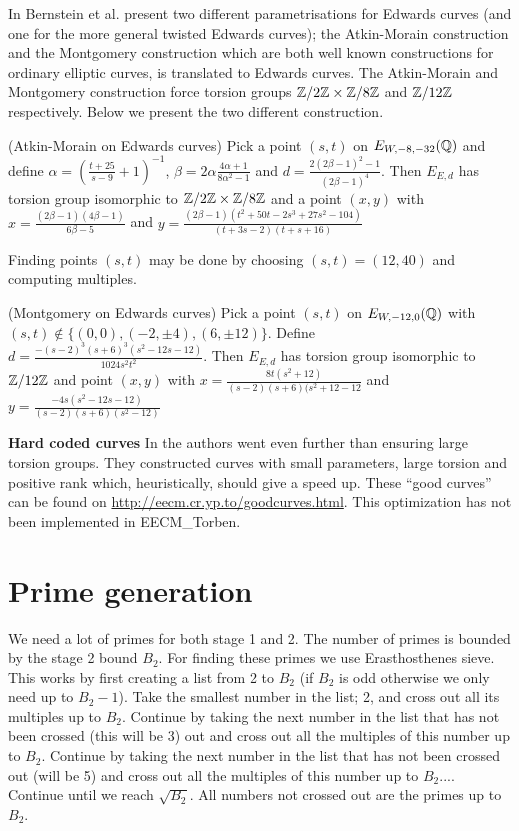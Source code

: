In \cite{2011/BBLP-eecm} Bernstein et al. present two different parametrisations for Edwards curves (and one for the more general twisted Edwards curves); the Atkin-Morain construction and the Montgomery construction which are both well known constructions for ordinary elliptic curves, is translated to Edwards curves. The Atkin-Morain and Montgomery construction force torsion groups $\mathbb{Z}/2\mathbb{Z}\times \mathbb{Z}/8\mathbb{Z}$ and $\mathbb{Z}/12\mathbb{Z}$ respectively. Below we present the two different construction.
\begin{thm}
(Atkin-Morain on Edwards curves) Pick a point $(s,t)$ on $E_{W,-8,-32}(\mathbb{Q})$ and define $\alpha=\left(\frac{t+25}{s-9}+1\right)^{-1}$, $\beta=2\alpha\frac{4\alpha+1}{8\alpha^2-1}$ and $d=\frac{2(2\beta-1)^2-1}{(2\beta-1)^4}$. Then $E_{E,d}$ has torsion group isomorphic to $\mathbb{Z}/2\mathbb{Z}\times \mathbb{Z}/8\mathbb{Z}$ and a point $(x,y)$ with $x=\frac{(2\beta-1)(4\beta-1)}{6\beta-5}$ and $y=\frac{(2\beta-1)(t^2+50t-2s^3+27s^2-104)}{(t+3s-2)(t+s+16)}$
\end{thm}
Finding points $(s,t)$ may be done by choosing $(s,t)=(12,40)$ and computing multiples. 
\begin{thm}
(Montgomery on Edwards curves) Pick a point $(s,t)$ on $E_{W,-12,0}(\mathbb{Q})$ with $(s,t)\notin \{(0,0),(-2,\pm 4),(6,\pm 12)\}$. Define $d=\frac{-(s-2)^3(s+6)^3(s^2-12s-12)}{1024s^2t^2}$. Then $E_{E,d}$ has torsion group isomorphic to $\mathbb{Z}/12\mathbb{Z}$ and point $(x,y)$ with $x=\frac{8t(s^2+12)}{(s-2)(s+6)(s^2+12-12}$ and $y=\frac{-4s(s^2-12s-12)}{(s-2)(s+6)(s^2-12)}$
\end{thm}

\textbf{Hard coded curves}
In \cite{2011/BBLP-eecm} the authors went even further than ensuring large torsion groups. They constructed curves with small parameters, large torsion and positive rank which, heuristically, should give a speed up. These ``good curves'' can be found on \url{http://eecm.cr.yp.to/goodcurves.html}. This optimization has not been implemented in EECM\_Torben. 

\section{Prime generation}
We need a lot of primes for both stage 1 and 2. The number of primes is bounded by the stage 2 bound $B_2$. For finding these primes we use Erasthosthenes sieve. This works by first creating a list from 2 to $B_2$ (if $B_2$ is odd otherwise we only need up to $B_2-1$). Take the smallest number in the list; 2, and cross out all its multiples up to $B_2$. Continue by taking the next number in the list that has not been crossed (this will be 3) out and cross out all the multiples of this number up to $B_2$. Continue by taking the next number in the list that has not been crossed out (will be 5) and cross out all the multiples of this number up to $B_2$.... Continue until we reach $\sqrt{B_2}$. All numbers not crossed out are the primes up to  $B_2$. 

